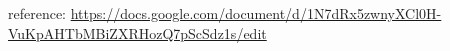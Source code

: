 \documentclass[openany]{book}
\begin{document}
reference: \url{https://docs.google.com/document/d/1N7dRx5zwnyXCl0H-VuKpAHTbMBiZXRHozQ7pScSdz1s/edit}





\end{document}
